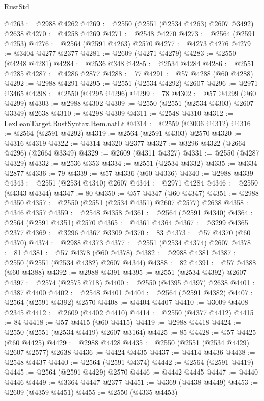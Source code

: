 \begin{lexlean}{RustStd}
\begin{coremodule}
@4263 := @2988 @4262
@4269 := @2550 (@2551 (@2534 @4263) @2607 @3492) @2638
@4270 := @4258 @4269
@4271 := @2548 @4270
@4273 := @2564 (@2591 @4253)
@4276 := @2564 (@2591 @4263) @2570
@4277 := @4273 @4276
@4279 := @3404 @4277 @2377
@4281 := @2609 (@4271 @4279)
@4283 := @2550 (@4248 @4281)
@4284 := @2536 @348
@4285 := @2534 @4284
@4286 := @2551 @4285
@4287 := @4286 @2877
@4288 := 77
@4291 := @57 @4288 (@60 @4288)
@4292 := @2988 @4291
@4295 := @2551 (@2534 @4292) @2607
@4296 := @2971 @3465
@4298 := @2550 (@4295 @4296)
@4299 := 78
@4302 := @57 @4299 (@60 @4299)
@4303 := @2988 @4302
@4309 := @2550 (@2551 (@2534 @4303) @2607 @3349) @2638
@4310 := @4298 @4309
@4311 := @2548 @4310
@4312 := LexLeanTarget.RustSyntax.Item.natLt
@4314 := @2559 (@3006 @4312)
@4316 := @2564 (@2591 @4292)
@4319 := @2564 (@2591 @4303) @2570
@4320 := @4316 @4319
@4322 := @4314 @4320 @2377
@4327 := @3296 @4322 (@2664 @4296) (@2664 @3349)
@4329 := @2609 (@4311 @4327)
@4331 := @2550 (@4287 @4329)
@4332 := @2536 @353
@4334 := @2551 (@2534 @4332)
@4335 := @4334 @2877
@4336 := 79
@4339 := @57 @4336 (@60 @4336)
@4340 := @2988 @4339
@4343 := @2551 (@2534 @4340) @2607
@4344 := @2971 @4284
@4346 := @2550 (@4343 @4344)
@4347 := 80
@4350 := @57 @4347 (@60 @4347)
@4351 := @2988 @4350
@4357 := @2550 (@2551 (@2534 @4351) @2607 @2577) @2638
@4358 := @4346 @4357
@4359 := @2548 @4358
@4361 := @2564 (@2591 @4340)
@4364 := @2564 (@2591 @4351) @2570
@4365 := @4361 @4364
@4367 := @3299 @4365 @2377
@4369 := @3296 @4367 @3309
@4370 := 83
@4373 := @57 @4370 (@60 @4370)
@4374 := @2988 @4373
@4377 := @2551 (@2534 @4374) @2607
@4378 := 81
@4381 := @57 @4378 (@60 @4378)
@4382 := @2988 @4381
@4387 := @2550 (@2551 (@2534 @4382) @2607 @4344)
@4388 := 82
@4391 := @57 @4388 (@60 @4388)
@4392 := @2988 @4391
@4395 := @2551 (@2534 @4392) @2607
@4397 := @2574 (@2575 @718)
@4400 := @2550 (@4395 @4397) @2638
@4401 := @4387 @4400
@4402 := @2548 @4401
@4404 := @2564 (@2591 @4382)
@4407 := @2564 (@2591 @4392) @2570
@4408 := @4404 @4407
@4410 := @3009 @4408 @2345
@4412 := @2609 (@4402 @4410)
@4414 := @2550 (@4377 @4412)
@4415 := 84
@4418 := @57 @4415 (@60 @4415)
@4419 := @2988 @4418
@4424 := @2550 (@2551 (@2534 @4419) @2607 @3164)
@4425 := 85
@4428 := @57 @4425 (@60 @4425)
@4429 := @2988 @4428
@4435 := @2550 (@2551 (@2534 @4429) @2607 @2577) @2638
@4436 := @4424 @4435
@4437 := @4414 @4436
@4438 := @2548 @4437
@4440 := @2564 (@2591 @4374)
@4442 := @2564 (@2591 @4419)
@4445 := @2564 (@2591 @4429) @2570
@4446 := @4442 @4445
@4447 := @4440 @4446
@4449 := @3364 @4447 @2377
@4451 := @4369 (@4438 @4449)
@4453 := @2609 (@4359 @4451)
@4455 := @2550 (@4335 @4453)

\end{coremodule}
\end{lexlean}
